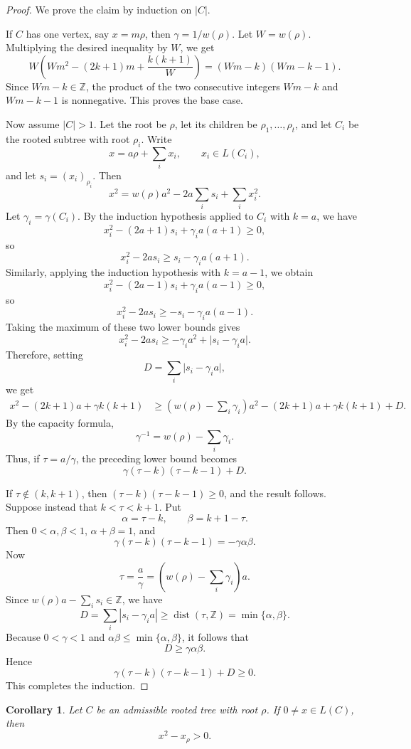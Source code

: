 \documentclass[11pt]{article}
\newtheorem{corollary}{Corollary}
\begin{document}
\begin{proof}
We prove the claim by induction on \(|C|\).

If \(C\) has one vertex, say \(x=m\rho\), then \(\gamma=1/w(\rho)\). Let \(W=w(\rho)\). Multiplying the desired inequality by \(W\), we get
\[
W\left(Wm^2-(2k+1)m+\frac{k(k+1)}{W}\right)
=
(Wm-k)(Wm-k-1).
\]
Since \(Wm-k\in\mathbb Z\), the product of the two consecutive integers \(Wm-k\) and \(Wm-k-1\) is nonnegative. This proves the base case.

Now assume \(|C|>1\). Let the root be \(\rho\), let its children be \(\rho_1,\dots,\rho_t\), and let \(C_i\) be the rooted subtree with root \(\rho_i\). Write
\[
x=a\rho+\sum_i x_i,
\qquad x_i\in L(C_i),
\]
and let \(s_i=(x_i)_{\rho_i}\). Then
\[
x^2=w(\rho)a^2-2a\sum_i s_i+\sum_i x_i^2.
\]
Let \(\gamma_i=\gamma(C_i)\). By the induction hypothesis applied to \(C_i\) with \(k=a\), we have
\[
x_i^2-(2a+1)s_i+\gamma_i a(a+1)\ge 0,
\]
so
\[
x_i^2-2as_i\ge s_i-\gamma_i a(a+1).
\]
Similarly, applying the induction hypothesis with \(k=a-1\), we obtain
\[
x_i^2-(2a-1)s_i+\gamma_i a(a-1)\ge 0,
\]
so
\[
x_i^2-2as_i\ge -s_i-\gamma_i a(a-1).
\]
Taking the maximum of these two lower bounds gives
\[
x_i^2-2as_i
\ge
-\gamma_i a^2+\bigl|s_i-\gamma_i a\bigr|.
\]
Therefore, setting
\[
D=\sum_i \bigl|s_i-\gamma_i a\bigr|,
\]
we get
\begin{align*}
x^2-(2k+1)a+\gamma k(k+1)
&\ge
\left(w(\rho)-\sum_i\gamma_i\right)a^2-(2k+1)a+\gamma k(k+1)+D.
\end{align*}
By the capacity formula,
\[
\gamma^{-1}=w(\rho)-\sum_i\gamma_i.
\]
Thus, if \(\tau=a/\gamma\), the preceding lower bound becomes
\[
\gamma(\tau-k)(\tau-k-1)+D.
\]

If \(\tau\notin(k,k+1)\), then \((\tau-k)(\tau-k-1)\ge 0\), and the result follows. Suppose instead that \(k<\tau<k+1\). Put
\[
\alpha=\tau-k,
\qquad
\beta=k+1-\tau.
\]
Then \(0<\alpha,\beta<1\), \(\alpha+\beta=1\), and
\[
\gamma(\tau-k)(\tau-k-1)=-\gamma\alpha\beta.
\]
Now
\[
\tau
=
\frac{a}{\gamma}
=
\left(w(\rho)-\sum_i\gamma_i\right)a.
\]
Since \(w(\rho)a-\sum_i s_i\in\mathbb Z\), we have
\[
D
=
\sum_i |s_i-\gamma_i a|
\ge
\operatorname{dist}(\tau,\mathbb Z)
=
\min\{\alpha,\beta\}.
\]
Because \(0<\gamma<1\) and \(\alpha\beta\le \min\{\alpha,\beta\}\), it follows that
\[
D\ge \gamma\alpha\beta.
\]
Hence
\[
\gamma(\tau-k)(\tau-k-1)+D\ge 0.
\]
This completes the induction.
\end{proof}

\begin{corollary}
Let \(C\) be an admissible rooted tree with root \(\rho\). If \(0\ne x\in L(C)\), then
\[
x^2-x_\rho>0.
\]
\end{corollary}
\end{document}
